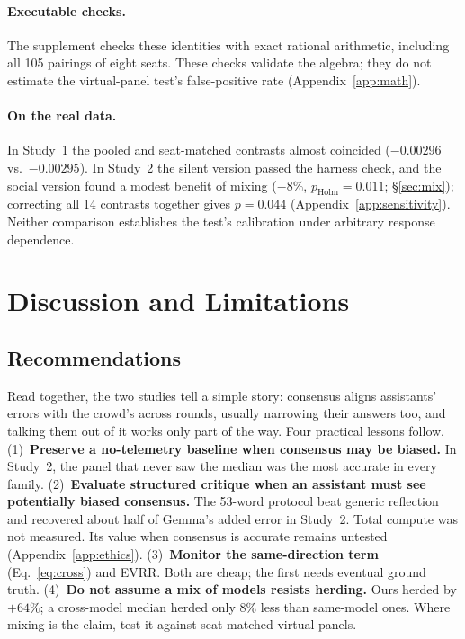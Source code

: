 \documentclass[10pt]{article}
\theoremstyle{manuscript}\newtheorem{proposition}{Proposition}
\newcommand{\pH}{p_{\text{Holm}}}
\begin{document}
\paragraph{Executable checks.} The supplement checks these identities with exact rational arithmetic, including all 105 pairings of eight seats. These checks validate the algebra; they do not estimate the virtual-panel test's false-positive rate (Appendix~\ref{app:math}).



\paragraph{On the real data.} In Study~1 the pooled and seat-matched contrasts almost coincided ($-0.00296$ vs.\ $-0.00295$). In Study~2 the silent version passed the harness check, and the social version found a modest benefit of mixing ($-8\%$, $\pH=0.011$; \S\ref{sec:mix}); correcting all 14 contrasts together gives $p=0.044$ (Appendix~\ref{app:sensitivity}). Neither comparison establishes the test's calibration under arbitrary response dependence.

\section{Discussion and Limitations}\label{sec:meaning}
\subsection{Recommendations}
Read together, the two studies tell a simple story: consensus aligns assistants' errors with the crowd's across rounds, usually narrowing their answers too, and talking them out of it works only part of the way. Four practical lessons follow. (1)~\textbf{Preserve a no-telemetry baseline when consensus may be biased.} In Study~2, the panel that never saw the median was the most accurate in every family. (2)~\textbf{Evaluate structured critique when an assistant must see potentially biased consensus.} The 53-word protocol beat generic reflection and recovered about half of Gemma's added error in Study~2. Total compute was not measured. Its value when consensus is accurate remains untested (Appendix~\ref{app:ethics}). (3)~\textbf{Monitor the same-direction term} (Eq.~\ref{eq:cross}) and EVRR. Both are cheap; the first needs eventual ground truth. (4)~\textbf{Do not assume a mix of models resists herding.} Ours herded by $+64\%$; a cross-model median herded only 8\% less than same-model ones. Where mixing is the claim, test it against seat-matched virtual panels.
\end{document}
